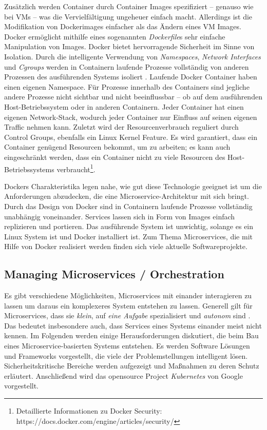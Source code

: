 Zusätzlich werden Container durch Container Images spezifiziert -- genauso wie bei VMs -- was die Vervielfältigung ungeheuer einfach macht. Allerdings ist die Modifikation von Dockerimages einfacher als das Ändern eines VM Images. Docker ermöglicht mithilfe eines sogenannten \textit{Dockerfile}s sehr einfache Manipulation von Images. 
Docker bietet hervorragende Sicherheit im Sinne von Isolation. Durch die intelligente Verwendung von \textit{Namespaces}, \textit{Network Interfaces} und \textit{Cgroups} werden in Containern laufende Prozesse vollständig von anderen Prozessen des ausführenden Systems isoliert \cite{newman2015,marmol2015}. Laufende Docker Container haben einen eigenen Namespace. Für Prozesse innerhalb des Containers sind jegliche andere Prozesse nicht sichtbar und nicht beeinflussbar -- ob auf dem ausführenden Host-Betriebssystem oder in anderen Containern. Jeder Container hat einen eigenen Network-Stack, wodurch jeder Container nur Einfluss auf seinen eigenen Traffic nehmen kann. Zuletzt wird der Resourcenverbrauch reguliert durch Control Groups, ebenfalls ein Linux Kernel Feature. Es wird garantiert, dass ein Container genügend Resourcen bekommt, um zu arbeiten; es kann auch eingeschränkt werden, dass ein Container nicht zu viele Resourcen des Host-Betriebssystems verbraucht\footnote{Detaillierte Informationen zu Docker Security: https://docs.docker.com/engine/articles/security/}.

Dockers Charakteristika legen nahe, wie gut diese Technologie geeignet ist um die Anforderungen abzudecken, die eine Microservice-Architektur mit sich bringt. Durch das Design von Docker sind in Containern laufende Prozesse vollständig unabhängig voneinander. Services lassen sich in Form von Images einfach replizieren und portieren. Das ausführende System ist unwichtig, solange es ein Linux System ist und Docker installiert ist. Zum Thema Microservices, die mit Hilfe von Docker realisiert werden finden sich viele aktuelle Softwareprojekte.


\subsection{Managing Microservices / \glqq Orchestration\grqq}

Es gibt verschiedene Möglichkeiten, Microservices mit einander interagieren zu lassen um daraus ein komplexeres System entstehen zu lassen. Generell gilt für Microservices, dass sie \textit{klein}, auf \textit{eine Aufgabe} spezialisiert und \textit{autonom} sind \cite{newman2015}. Das bedeutet insbesondere auch, dass Services eines Systems einander meist nicht kennen. Im Folgenden werden einige Herausforderungen diskutiert, die beim Bau eines Microservice-basierten Systems entstehen. Es werden Software Lösungen und Frameworks vorgestellt, die viele der Problemstellungen intelligent lösen. Sicherheitskritische Bereiche werden aufgezeigt und Maßnahmen zu deren Schutz erläutert. Anschließend wird das opensource Project \textit{Kubernetes} von Google vorgestellt.

